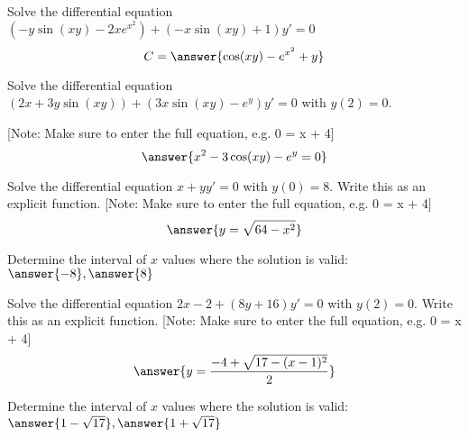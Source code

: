 \documentclass{ximera}
\begin{document}
\begin{exercise}
    Solve the differential equation $(-y\sin(xy) - 2xe^{x^2}) + (-x\sin(xy) + 1)y' = 0$
    \[
        C = \answer{\cos(xy) - e^{x^2} + y}
    \]
\end{exercise}

\begin{exercise}
    
    Solve the differential equation $(2x + 3y\sin(xy)) + (3x\sin(xy) - e^y)y' = 0$ with $y(2) = 0$.
    
    [Note: Make sure to enter the full equation, e.g. 0 = x + 4]
    \[
        \answer{x^2 - 3\cos(xy) - e^y = 0}
    \]
    
\end{exercise}

\begin{exercise}
    Solve the differential equation $x + yy' = 0$ with $y(0) = 8$. Write this as an explicit function.
    [Note: Make sure to enter the full equation, e.g. 0 = x + 4]
    \[
        \answer{y = \sqrt{64-x^2}}
    \]
    \begin{problem}
        Determine the interval of $x$ values where the solution is valid:
        \wordChoice{\choice{(}\choice[correct]{[}}$\answer{-8},\answer{8}$\wordChoice{\choice{)}\choice[correct]{]}}
    \end{problem}
    
\end{exercise}

\begin{exercise}
    Solve the differential equation $2x-2 + (8y+16)y' = 0$ with $y(2) = 0$. Write this as an explicit function.
    [Note: Make sure to enter the full equation, e.g. 0 = x + 4]
    \[
        \answer{y = \frac{-4 + \sqrt{17 - (x-1)^2}}{2}}
    \]
    \begin{problem}
        Determine the interval of $x$ values where the solution is valid:
        \wordChoice{\choice{(}\choice[correct]{[}}$\answer{1 - \sqrt{17}},\answer{1 + \sqrt{17}}$\wordChoice{\choice{)}\choice[correct]{]}}
    \end{problem}
\end{exercise}
\end{document}
